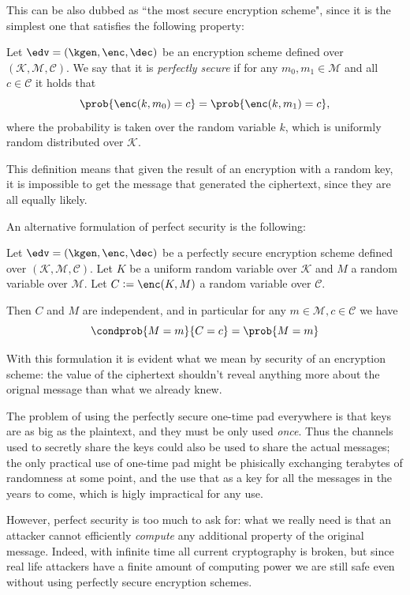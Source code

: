 This can be also dubbed as ``the most secure encryption scheme", since it is the simplest one that satisfies the following property:
\begin{definition}
    Let $\edv=(\kgen,\enc,\dec)$ be an encryption scheme defined over $(\mathcal K, \mathcal M, \mathcal C)$. We say that it is \emph{perfectly secure} if for any $m_0,m_1\in\mathcal M$ and all $c\in\mathcal C$ it holds that 
    $$\prob{\enc(k,m_0)=c} = \prob{\enc(k,m_1)=c},$$
    where the probability is taken over the random variable $k$, which is uniformly random distributed over $\mathcal K$.
\end{definition}

This definition means that given the result of an encryption with a random key, it is impossible to get the message that generated the ciphertext, since they are all equally likely.

An alternative formulation of perfect security is the following:
\begin{proposition}
    Let $\edv=(\kgen,\enc,\dec)$ be a perfectly secure encryption scheme defined over $(\mathcal K, \mathcal M, \mathcal C)$. Let $K$ be a uniform random variable over $\mathcal K$ and $M$ a random variable over $\mathcal M$. Let $C:=\enc(K,M)$ a random variable over $\mathcal C$.
    
    Then $C$ and $M$ are independent, and in particular for any $m\in\mathcal M,c\in\mathcal C$ we have $$\condprob{M=m}{C=c} = \prob{M=m}$$
\end{proposition}

With this formulation it is evident what we mean by security of an encryption scheme: the value of the ciphertext shouldn't reveal anything more about the orignal message than what we already knew.

The problem of using the perfectly secure one-time pad everywhere is that keys are as big as the plaintext, and they must be only used \emph{once}. Thus the channels used to secretly share the keys could also be used to share the actual messages; the only practical use of one-time pad might be phisically exchanging terabytes of randomness at some point, and the use that as a key for all the messages in the years to come, which is higly impractical for any use.

However, perfect security is too much to ask for: what we really need is that an attacker cannot efficiently \emph{compute} any additional property of the original message. Indeed, with infinite time all current cryptography is broken, but since real life attackers have a finite amount of computing power we are still safe even without using perfectly secure encryption schemes.

